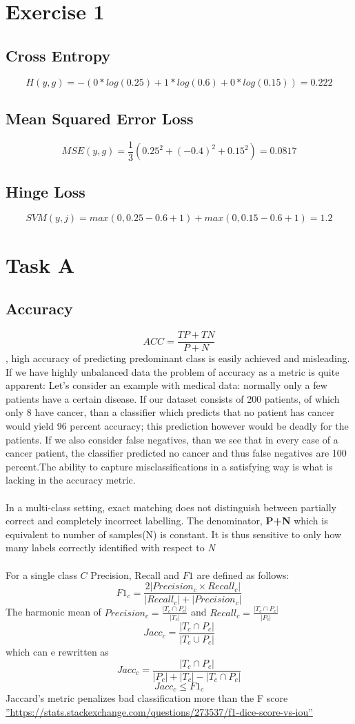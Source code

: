 \documentclass[10pt]{article}
\begin{document}
\section{Exercise 1}
\subsection{Cross Entropy}
$$H(y,g)= -(0*log(0.25)+1*log(0.6)+0*log(0.15))=0.222$$
\subsection{Mean Squared Error Loss}
$$MSE(y,g)= \frac{1}{3}(0.25^2+(-0.4)^2+0.15^2)=0.0817$$
\subsection{Hinge Loss}
$$SVM(y,j)=max(0,0.25-0.6+1)+max(0,0.15-0.6+1)= 1.2$$

\section{Task A}
\subsection{Accuracy}
$$ACC = \frac{TP+TN}{P+N}$$, high accuracy of predicting predominant class is easily achieved and misleading.
If we have highly unbalanced data the problem of accuracy as a metric is quite apparent:
Let's consider an example with medical data: normally only a few patients have a certain disease.
If our dataset consists of 200 patients, of which only 8 have cancer, than a classifier which predicts
that no patient has cancer would yield 96 percent accuracy;
this prediction however would be deadly for the patients.
If we also consider false negatives, than we see that in every case of a cancer patient,
the classifier predicted no cancer and thus false negatives are 100 percent.The ability to  capture misclassifications in a satisfying way is what is lacking in the accuracy metric.
\paragraph{}
In a multi-class setting, exact matching does not distinguish between partially correct and completely incorrect labelling.
The denominator, \textbf{P+N} which is equivalent to number of samples(N) is constant. It is thus sensitive to only how many labels correctly identified with respect to \textit{N}
\paragraph{}
For a single class $C$ Precision, Recall and  $F1$ are defined as follows:
 $$F1_c =\frac{2|{Precision_c}\times{Recall_c}|}{|Recall_c|+|Precision_c|}$$
 The harmonic mean of  $Precision_c =\frac{|{T_c}\cap{P_c}|}{|T_c|}$ and $Recall_c =\frac{|{T_c}\cap{P_c}|}{|P_c|}$
 $$Jacc_c =\frac{|{T_c}\cap{P_c}|}{|{T_c}\cup{P_c}|}$$
 which can e rewritten as
 $$Jacc_c =\frac{|{T_c}\cap{P_c}|}{|P_c|+|T_c|-|{T_c}\cap{P_c}|}$$
 $$Jacc_c\leq{F1_c}$$
Jaccard's metric penalizes bad classification more than the F score \hyperref[besteval]{''https://stats.stackexchange.com/questions/273537/f1-dice-score-vs-iou''}
\end{document}
